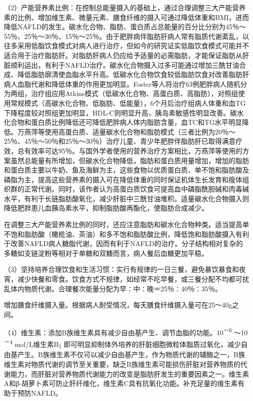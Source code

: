 （2）产能营养素比例：在控制总能量摄入的基础上，通过合理调整三大产能营养素的比例、增加维生素、微量元素、膳食纤维的摄入可通过降低体重和BMI，进而降低NAFLD的发生。碳水化合物、脂肪、蛋白质占总能量的百分比分别为45％～55％、25％～30％、15％～25％。由于肥胖病伴脂肪肝病人常有脂质代谢紊乱，以往多采用低脂饮食模式对病人进行治疗，但如今的研究证实低脂饮食模式可能并不适合用于治疗脂肪肝。对脂肪肝病人仍应给予适量的必需脂肪，才能保证脂肪从肝脏顺利运出，有利于NAFLD治疗。碳水化合物摄入过多可能通过增加三酰甘油合成、降低脂肪廓清使血脂水平升高。低碳水化合物饮食较低脂肪饮食对改善脂肪肝病人血脂代谢和降低体重的作用更加明显。Foster等人将治疗63例肥胖病人随机分为两组，治疗组应用Atkins模式（低碳水化合物、高蛋白质、高脂肪），对照组使用常规模式（高碳水化合物、低脂肪、低能量），6个月后治疗组病人体重和血TG下降程度较对照组更加明显，HDL-C则明显升高，胰岛素敏感性明显改善。碳水化合物和蛋白质比例降低还可降低肥胖病人体内脂肪含量，血TC和TG水平明显降低。万燕萍等使用高蛋白质、适量碳水化合物和脂肪模式（三者比例为20％～25％、45％～50％和25％～30％）治疗儿童、青少年肥胖伴脂肪肝已取得满意疗效，总有效率可达95％。与国外学者使用的营养治疗方案相比，万燕萍等使用的方案虽然总能量有所增加，但碳水化合物降低，脂肪和蛋白质用量增加，增加的脂肪和蛋白质主要以牛奶、鱼及海鲜为主，这些食物以优质蛋白质、单不饱和脂肪酸及磷脂为主，提高这些营养素的摄入可在降低体重的同时保证机体生长发育和瘦体组织群的正常代谢。同时，该作者认为高蛋白质饮食可提高血中磷脂酰胆碱和肉毒碱水平，有利于长链脂肪酸氧化，减少肝脏中三酰甘油堆积。适量碳水化合物摄入则降低肥胖患儿血胰岛素水平，抑制脂肪酸再酯化，使脂肪合成减少。

在调整三大产能营养素比例的同时，还应注意脂肪和碳水化合物种类。适当提高单不饱和脂肪酸（橄榄油、茶油）和多不饱和脂肪酸比例，降低饱和脂肪酸摄入有利于改善NAFLD病人糖脂代谢，因而有利于NAFLD的治疗。分子结构相对复杂的多糖如支链淀粉等相对于单糖和双糖而言，病人餐后血糖更加平稳。

（3）坚持培养合理饮食和生活习惯：实行有规律的一日三餐，避免暴饮暴食和夜宵，减少快餐和零食。饮食方式不规律，如经常不吃早餐，或三餐分配不均都可扰乱体内物质代谢。合理餐次能量分配为早∶中∶晚＝25％∶40％∶35％。

增加膳食纤维摄入量。根据病人耐受情况，每天膳食纤维摄入量可在25～40g之间。

（4）维生素：添加B族维生素具有减少自由基产生、调节血脂的功能。10\textsuperscript{－6}
～10\textsuperscript{－4} mol/L维生素B\textsubscript{1}
即可明显抑制体外培养的肝脏细胞微粒体脂质过氧化，减少自由基产生。B族维生素不仅可以减少自由基产生，作为物质代谢的辅酶之一，B族维生素对物质代谢的调节至关重要，缺乏B族维生素可能损伤肝脏对营养物质的代谢能力，而肝脏对营养物质代谢能力的改变是脂肪肝发生的重要因素之一。维生素A和β-胡萝卜素可防止肝纤维化，维生素C具有抗氧化功能。补充足量的维生素有助于预防NAFLD。

